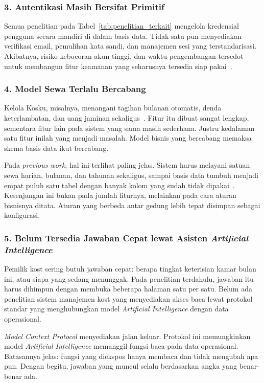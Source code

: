 \subsubsection{3. Autentikasi Masih Bersifat Primitif}

Semua penelitian pada Tabel~\ref{tab:penelitian_terkait} mengelola kredensial pengguna secara mandiri di dalam basis data. Tidak satu pun menyediakan verifikasi email, pemulihan kata sandi, dan manajemen sesi yang terstandarisasi. Akibatnya, risiko kebocoran akun tinggi, dan waktu pengembangan tersedot untuk membangun fitur keamanan yang seharusnya tersedia siap pakai~\cite{rasyidatur2025,roihanah2025,rizal2025,bagus2025}.

\subsubsection{4. Model Sewa Terlalu Bercabang}

Kelola Kosku, misalnya, menangani tagihan bulanan otomatis, denda keterlambatan, dan uang jaminan sekaligus~\cite{jscr2025}. Fitur itu dibuat sangat lengkap, sementara fitur lain pada sistem yang sama masih sederhana. Justru kedalaman satu fitur inilah yang menjadi masalah. Model bisnis yang bercabang memaksa skema basis data ikut bercabang.

Pada \textit{previous work}, hal ini terlihat paling jelas. Sistem harus melayani satuan sewa harian, bulanan, dan tahunan sekaligus, sampai basis data tumbuh menjadi empat puluh satu tabel dengan banyak kolom yang sudah tidak dipakai~\cite{rasyidatur2025,roihanah2025,rizal2025,bagus2025}. Kesenjangan ini bukan pada jumlah fiturnya, melainkan pada cara aturan bisnisnya ditata. Aturan yang berbeda antar gedung lebih tepat disimpan sebagai konfigurasi.

\subsubsection{5. Belum Tersedia Jawaban Cepat lewat Asisten \textit{Artificial Intelligence}}

Pemilik kost sering butuh jawaban cepat: berapa tingkat keterisian kamar bulan ini, atau siapa yang sedang menunggak. Pada penelitian terdahulu, jawaban itu harus dihimpun dengan membuka beberapa halaman satu per satu. Belum ada penelitian sistem manajemen kost yang menyediakan akses baca lewat protokol standar yang menghubungkan model \textit{Artificial Intelligence} dengan data operasional.

\textit{Model Context Protocol} menyediakan jalan keluar. Protokol ini memungkinkan model \textit{Artificial Intelligence} memanggil fungsi baca pada data operasional. Batasannya jelas: fungsi yang diekspos hanya membaca dan tidak mengubah apa pun. Dengan begitu, jawaban yang muncul selalu berdasarkan angka yang benar-benar ada.

